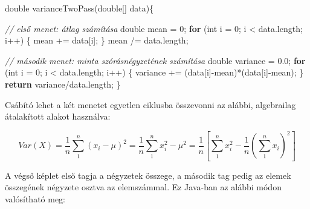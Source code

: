 \documentclass[
]{article}
\newenvironment{Shaded}{}{}
\newcommand{\CommentTok}[1]{\textcolor[rgb]{0.38,0.63,0.69}{\textit{#1}}}
\newcommand{\ControlFlowTok}[1]{\textcolor[rgb]{0.00,0.44,0.13}{\textbf{#1}}}
\newcommand{\DataTypeTok}[1]{\textcolor[rgb]{0.56,0.13,0.00}{#1}}
\newcommand{\DecValTok}[1]{\textcolor[rgb]{0.25,0.63,0.44}{#1}}
\newcommand{\FloatTok}[1]{\textcolor[rgb]{0.25,0.63,0.44}{#1}}
\newcommand{\FunctionTok}[1]{\textcolor[rgb]{0.02,0.16,0.49}{#1}}
\newcommand{\NormalTok}[1]{#1}
\newcommand{\OperatorTok}[1]{\textcolor[rgb]{0.40,0.40,0.40}{#1}}
\begin{document}
\begin{Shaded}
\begin{Highlighting}[]
\DataTypeTok{double} \FunctionTok{varianceTwoPass}\OperatorTok{(}\DataTypeTok{double}\OperatorTok{[]}\NormalTok{ data}\OperatorTok{)\{}

    \CommentTok{// első menet: átlag számítása}
    \DataTypeTok{double}\NormalTok{ mean }\OperatorTok{=} \DecValTok{0}\OperatorTok{;}
    \ControlFlowTok{for} \OperatorTok{(}\DataTypeTok{int}\NormalTok{ i }\OperatorTok{=} \DecValTok{0}\OperatorTok{;}\NormalTok{ i }\OperatorTok{\textless{}}\NormalTok{ data}\OperatorTok{.}\FunctionTok{length}\OperatorTok{;}\NormalTok{ i}\OperatorTok{++)} \OperatorTok{\{}
\NormalTok{        mean }\OperatorTok{+=}\NormalTok{ data}\OperatorTok{[}\NormalTok{i}\OperatorTok{];}
    \OperatorTok{\}}
\NormalTok{    mean }\OperatorTok{/=}\NormalTok{ data}\OperatorTok{.}\FunctionTok{length}\OperatorTok{;}

    \CommentTok{// második menet: minta szórásnégyzetének számítása}
    \DataTypeTok{double}\NormalTok{ variance }\OperatorTok{=} \FloatTok{0.0}\OperatorTok{;}
    \ControlFlowTok{for} \OperatorTok{(}\DataTypeTok{int}\NormalTok{ i }\OperatorTok{=} \DecValTok{0}\OperatorTok{;}\NormalTok{ i }\OperatorTok{\textless{}}\NormalTok{ data}\OperatorTok{.}\FunctionTok{length}\OperatorTok{;}\NormalTok{ i}\OperatorTok{++)} \OperatorTok{\{}
\NormalTok{        variance }\OperatorTok{+=} \OperatorTok{(}\NormalTok{data}\OperatorTok{[}\NormalTok{i}\OperatorTok{]{-}}\NormalTok{mean}\OperatorTok{)*(}\NormalTok{data}\OperatorTok{[}\NormalTok{i}\OperatorTok{]{-}}\NormalTok{mean}\OperatorTok{);}
    \OperatorTok{\}}
    \ControlFlowTok{return}\NormalTok{ variance}\OperatorTok{/}\NormalTok{data}\OperatorTok{.}\FunctionTok{length}\OperatorTok{;}
\OperatorTok{\}}
\end{Highlighting}
\end{Shaded}

Csábító lehet a két menetet egyetlen ciklusba összevonni az alábbi,
algebrailag átalakított alakot használva:

\[Var(X) = \frac{1}{n}\sum_{1}^{n}(x_i - \mu)^2 = \frac{1}{n}\sum_{1}^{n} x_i^2 - \mu^2 = \frac{1}{n}\left[\sum_{1}^{n} x_i^2 - \frac{1}{n}\left(\sum_{1}^{n} x_i\right)^2\right]\]

A végső képlet első tagja a négyzetek összege, a második tag pedig az
elemek összegének négyzete osztva az elemszámmal. Ez Java-ban az alábbi
módon valósítható meg:
\end{document}
